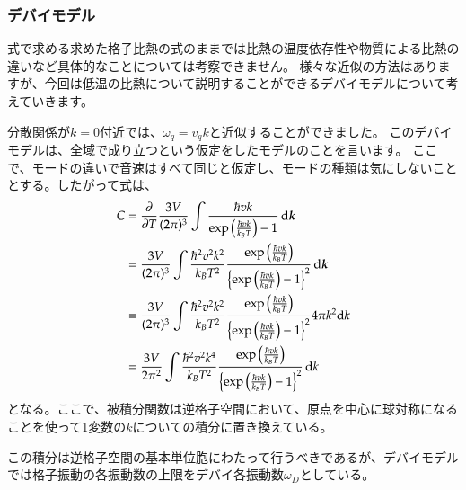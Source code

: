 \documentclass[10pt,b5paper,papersize,dvipdfmx]{jsbook}
\begin{document}
\subsubsection*{デバイモデル}
式で求める求めた格子比熱の式のままでは比熱の温度依存性や物質による比熱の違いなど具体的なことについては考察できません。
様々な近似の方法はありますが、今回は低温の比熱について説明することができるデバイモデルについて考えていきます。\par
分散関係が$k = 0$付近では、$\omega_q = v_q k$と近似することができました。
このデバイモデルは、全域で成り立つという仮定をしたモデルのことを言います。
ここで、モードの違いで音速はすべて同じと仮定し、モードの種類は気にしないこととする。したがって式は、
\begin{align}
  C &= \pdv{T} \frac{3V}{(2\pi)^3} \int\frac{\hbar v k}{\exp \left(\frac{\hbar v k}{k_BT}\right)-1 }\dd{\bm{k}} \notag\\
  & = \frac{3V}{(2\pi)^3} \int \frac{\hbar^2 v^2 k ^2}{k_B T ^2}  \frac{\exp \left(\frac{\hbar v k}{k_BT}\right)}{\left\{\exp \left(\frac{\hbar v k}{k_BT}\right)-1 \right\}^2}\dd{\bm{k}} \notag\\
  &= \frac{3V}{(2\pi)^3} \int \frac{\hbar^2 v^2 k ^2}{k_B T ^2}  \frac{\exp \left(\frac{\hbar v k}{k_BT}\right)}{\left\{\exp \left(\frac{\hbar v k}{k_BT}\right)-1 \right\}^2} 4 \pi k^2 \dd k \notag\\
  &= \frac{3V}{2\pi^2} \int \frac{\hbar^2 v^2 k ^4}{k_B T ^2}  \frac{\exp \left(\frac{\hbar v k}{k_BT}\right)}{\left\{\exp \left(\frac{\hbar v k}{k_BT}\right)-1 \right\}^2} \dd {k}
  \label{eq:daigakutoutyaku}
\end{align}
となる。ここで、被積分関数は逆格子空間において、原点を中心に球対称になることを使って1変数の$k$についての積分に置き換えている。\par
この積分は逆格子空間の基本単位胞にわたって行うべきであるが、デバイモデルでは格子振動の各振動数の上限をデバイ各振動数$\omega_D$としている。
\end{document}
